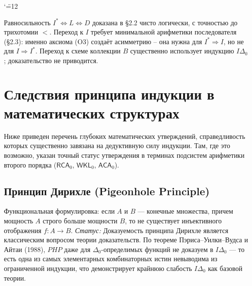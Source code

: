 \documentclass[12pt,a4paper]{article}
\theoremstyle{plain}
\theoremstyle{definition}
\newcommand{\toinf}{\rightarrow}
\begin{document}
\begin{center}
\catcode`\"=12
\end{center}

Равносильность $I^*\Leftrightarrow L\Leftrightarrow D$ доказана в §2.2 чисто логически, с точностью до трихотомии $<$. Переход к $I$ требует минимальной арифметики последователя (§2.3): именно аксиома (O3) создаёт асимметрию -- она нужна для $I^*\Rightarrow I$, но не для $I\Rightarrow I^*$. Переход к схеме коллекции $B$ существенно использует индукцию $I\Delta_0$; доказательство не приводится.

\section{Следствия принципа индукции в математических структурах}

Ниже приведен перечень глубоких математических утверждений, справедливость которых существенно завязана на дедуктивную силу индукции. Там, где это возможно, указан точный статус утверждения в терминах подсистем арифметики второго порядка ($\textsf{RCA}_0$, $\textsf{WKL}_0$, $\textsf{ACA}_0$).

\subsection{Принцип Дирихле (Pigeonhole Principle)}
Функциональная формулировка: если $A$ и $B$ --- конечные множества, причем мощность $A$ строго больше мощности $B$, то не существует инъективного отображения $f: A \toinf B$.
\textit{Статус:} Доказуемость принципа Дирихле является классическим вопросом теории доказательств. По теореме Пэриса--Уилки--Вудса и Айтаи (1988), $PHP$ даже для $\Delta_0$-определимых функций не доказуем в $I\Delta_0$ --- то есть одна из самых элементарных комбинаторных истин невыводима из ограниченной индукции, что демонстрирует крайнюю слабость $I\Delta_0$ как базовой теории.
\end{document}
